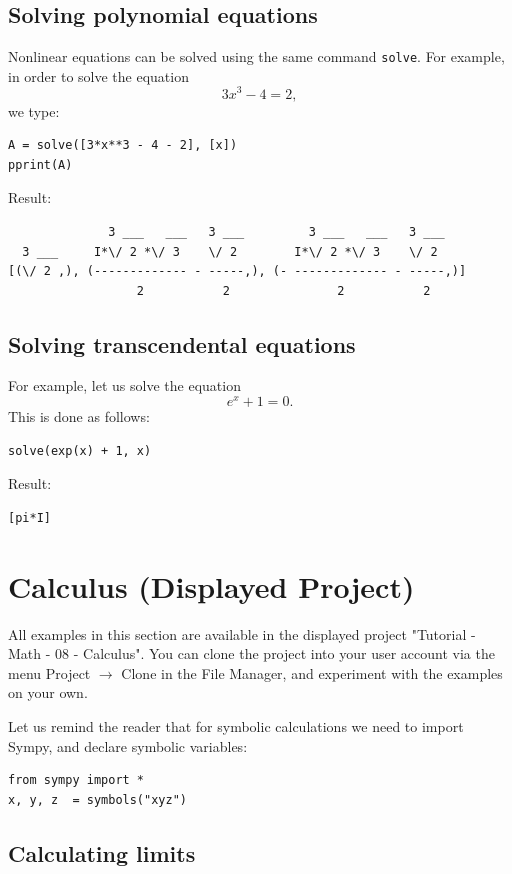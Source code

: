 \documentclass[article,A4,12pt]{llncs}
\begin{document}
\subsection{Solving polynomial equations}

Nonlinear equations can be solved using the same command {\tt solve}.
For example, in order to solve the equation 
$$
3x^3 - 4 = 2,
$$
we type:
\begin{verbatim}
A = solve([3*x**3 - 4 - 2], [x])
pprint(A)
\end{verbatim}
Result:
\begin{verbatim}
              3 ___   ___   3 ___         3 ___   ___   3 ___   
  3 ___     I*\/ 2 *\/ 3    \/ 2        I*\/ 2 *\/ 3    \/ 2    
[(\/ 2 ,), (------------- - -----,), (- ------------- - -----,)]
                  2           2               2           2     
\end{verbatim}

\subsection{Solving transcendental equations}

For example, let us solve the equation
$$
e^x + 1 = 0.
$$
This is done as follows:
\begin{verbatim}
solve(exp(x) + 1, x)
\end{verbatim}
Result:
\begin{verbatim}
[pi*I]
\end{verbatim}


\section{Calculus (Displayed Project)}

All examples in this section are available in the displayed project 
"Tutorial - Math - 08 - Calculus". You can clone the project into 
your user account via the menu Project $\rightarrow$ Clone in the File 
Manager, and experiment with the examples on your own.

Let us remind the reader that for symbolic calculations we need to 
import Sympy, and declare symbolic variables:
\begin{verbatim}
from sympy import *
x, y, z  = symbols("xyz")
\end{verbatim}

\subsection{Calculating limits}
\end{document}
